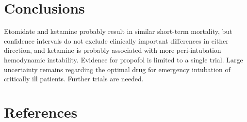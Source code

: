 \documentclass[11pt]{article}
\begin{document}
\section{Conclusions}

Etomidate and ketamine probably result in similar short-term mortality, but confidence intervals do not exclude clinically important differences in either direction, and ketamine is probably associated with more peri-intubation hemodynamic instability. Evidence for propofol is limited to a single trial. Large uncertainty remains regarding the optimal drug for emergency intubation of critically ill patients. Further trials are needed.

\section*{References}
\end{document}
